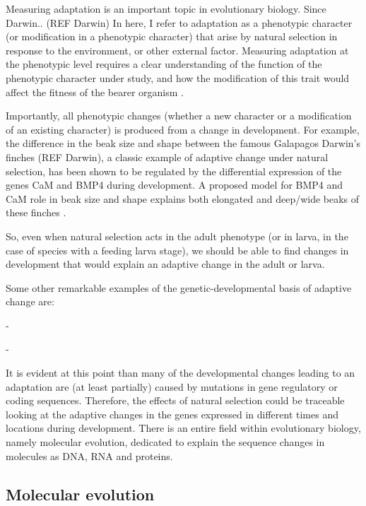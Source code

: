 Measuring adaptation is an important topic in evolutionary biology.
Since Darwin.. (REF Darwin)
In here, I refer to adaptation as a phenotypic character (or modification in a phenotypic character) that arise by natural selection in response to the environment, or other external factor.
Measuring adaptation at the phenotypic level requires a clear understanding of the function of the phenotypic character under study, and how the modification of this trait would affect the fitness of the bearer organism 
	\citep{EmiliaSantos2015}. 

Importantly, all phenotypic changes (whether a new character or a modification of an existing character) is produced from a change in development.
For example, the difference in the beak size and shape between the famous Galapagos Darwin's finches (REF Darwin), a classic example of adaptive change under natural selection, has been shown to be regulated by the differential expression of the genes CaM 
and BMP4 
during development. A proposed model for BMP4 and CaM role in beak size and shape explains both elongated and deep/wide beaks of these finches
	\citep{Abzhanov2006}.

So, even when natural selection acts in the adult phenotype (or in larva, in the case of species with a feeding larva stage), we should be able to find changes in development that would explain an adaptive change in the adult or larva.


Some other remarkable examples of the genetic-developmental basis of adaptive change are:

-

-

It is evident at this point than many of the developmental changes leading to an adaptation are (at least partially) caused by mutations in gene regulatory or coding sequences.
Therefore, the effects of natural selection could be traceable looking at the adaptive changes in the genes expressed in different times and locations during development. There is an entire field within evolutionary biology, namely molecular evolution, dedicated to explain the sequence changes in molecules as DNA,
RNA 
and proteins. 


\subsection{Molecular evolution}

